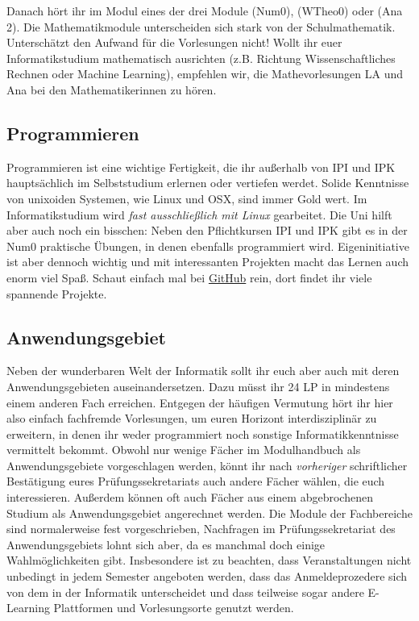 Danach hört ihr im Modul  eines der drei Module  (\gls{Num0}),  (\gls{WTheo0}) oder  (\gls{Ana} 2). Die Mathematikmodule unterscheiden sich stark von der Schulmathematik. Unterschätzt den Aufwand für die Vorlesungen nicht! Wollt ihr euer Informatikstudium mathematisch ausrichten (z.B. Richtung Wissenschaftliches Rechnen oder Machine Learning), empfehlen wir, die Mathevorlesungen \gls{LA} und \gls{Ana} bei den Mathematikerinnen zu hören.

\subsection{Programmieren}

Programmieren ist eine wichtige Fertigkeit, die ihr außerhalb von \gls{IPI} und \gls{IPK} hauptsächlich im Selbststudium erlernen oder vertiefen werdet. Solide Kenntnisse von unixoiden Systemen, wie Linux und OSX, sind immer Gold wert. Im Informatikstudium wird \emph{fast ausschließlich mit Linux} gearbeitet. Die Uni hilft aber auch noch ein bisschen: Neben den Pflichtkursen \gls{IPI} und \gls{IPK} gibt es in der \gls{Num0} praktische Übungen, in denen ebenfalls programmiert wird. Eigeninitiative ist aber dennoch wichtig und mit interessanten Projekten macht das Lernen auch enorm viel Spaß. Schaut einfach mal bei \href{https://github.com}{GitHub} rein, dort findet ihr viele spannende Projekte.

\subsection{Anwendungsgebiet}

Neben der wunderbaren Welt der Informatik sollt ihr euch aber auch mit deren Anwendungsgebieten auseinandersetzen. Dazu müsst ihr 24 \gls{LP} in mindestens einem anderen Fach erreichen. Entgegen der häufigen Vermutung hört ihr hier also einfach fachfremde Vorlesungen, um euren Horizont interdisziplinär zu erweitern, in denen ihr weder programmiert noch sonstige Informatikkenntnisse vermittelt bekommt. Obwohl nur wenige Fächer im Modulhandbuch als Anwendungsgebiete vorgeschlagen werden, könnt ihr nach \emph{vorheriger} schriftlicher Bestätigung eures Prüfungssekretariats auch andere Fächer wählen, die euch interessieren. Außerdem können oft auch Fächer aus einem abgebrochenen Studium als Anwendungsgebiet angerechnet werden. Die Module der Fachbereiche sind normalerweise fest vorgeschrieben, Nachfragen im Prüfungssekretariat des Anwendungsgebiets lohnt sich aber, da es manchmal doch einige Wahlmöglichkeiten gibt. Insbesondere ist zu beachten, dass Veranstaltungen nicht unbedingt in jedem Semester angeboten werden, dass das Anmeldeprozedere sich von dem in der Informatik unterscheidet und dass teilweise sogar andere E-Learning Plattformen und Vorlesungsorte genutzt werden.


